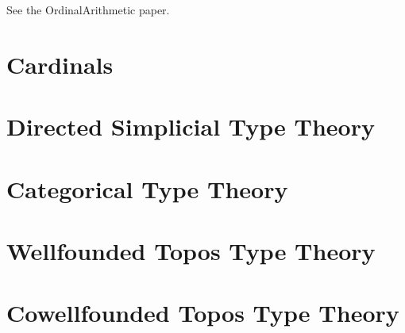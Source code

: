 \documentclass[a4paper,openany]{amsbook}
\begin{document}
See the OrdinalArithmetic paper.

\chapter{Cardinals}

\chapter{Directed Simplicial Type Theory}

\chapter{Categorical Type Theory}

\chapter{Wellfounded Topos Type Theory}

\chapter{Cowellfounded Topos Type Theory}

\printbibliography
\end{document}

